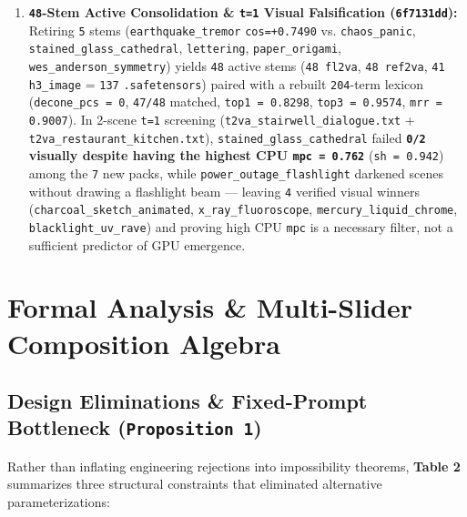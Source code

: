 \documentclass[10pt]{article}
\begin{document}
\begin{enumerate}[leftmargin=*]
\item \textbf{\texttt{48}-Stem Active Consolidation \& \texttt{t=1} Visual Falsification (\texttt{6f7131dd}):} Retiring \texttt{5} stems (\texttt{earthquake\_tremor} \texttt{cos=+0.7490} vs. \texttt{chaos\_panic}, \texttt{stained\_glass\_cathedral}, \texttt{lettering}, \texttt{paper\_origami}, \texttt{wes\_anderson\_symmetry}) yields \texttt{48} active stems (\texttt{48 fl2va}, \texttt{48 ref2va}, \texttt{41 h3\_image} = \texttt{137} \texttt{.safetensors}) paired with a rebuilt \texttt{204}-term lexicon (\texttt{decone\_pcs = 0}, \texttt{47/48} matched, \texttt{top1 = 0.8298}, \texttt{top3 = 0.9574}, \texttt{mrr = 0.9007}). In 2-scene \texttt{t=1} screening (\texttt{t2va\_stairwell\_dialogue.txt} + \texttt{t2va\_restaurant\_kitchen.txt}), \texttt{stained\_glass\_cathedral} failed \textbf{\texttt{0/2} visually despite having the highest CPU \texttt{mpc = 0.762}} (\texttt{sh = 0.942}) among the \texttt{7} new packs, while \texttt{power\_outage\_flashlight} darkened scenes without drawing a flashlight beam --- leaving \texttt{4} verified visual winners (\texttt{charcoal\_sketch\_animated}, \texttt{x\_ray\_fluoroscope}, \texttt{mercury\_liquid\_chrome}, \texttt{blacklight\_uv\_rave}) and proving high CPU \texttt{mpc} is a necessary filter, not a sufficient predictor of GPU emergence.
\end{enumerate}


\section{Formal Analysis \& Multi-Slider Composition Algebra}

\subsection{Design Eliminations \& Fixed-Prompt Bottleneck (\texttt{Proposition 1})}

Rather than inflating engineering rejections into impossibility theorems, \textbf{Table 2} summarizes three structural constraints that eliminated alternative parameterizations:
\end{document}
